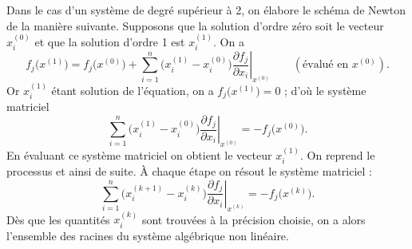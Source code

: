 Dans le cas d'un système de degré supérieur à 2, on élabore le schéma de
Newton de la manière suivante. Supposons que la solution d'ordre zéro soit le
vecteur $x_i^{(0)}$ et que la solution d'ordre 1 est $x_i^{(1)}$. On a
\[
  f_j\bigl(x^{(1)}\bigr) = f_j\bigl(x^{(0)}\bigr)
  + \sum_{i=1}^{n}\bigl(x_i^{(1)} - x_i^{(0)}\bigr)
    \left.\frac{\partial f_j}{\partial x_i}\right|_{x^{(0)}}
  \qquad (\text{évalué en } x^{(0)}) .
\]
Or $x_i^{(1)}$ étant solution de l'équation, on a $f_j\bigl(x^{(1)}\bigr) = 0$ ;
d'où le système matriciel
\[
  \sum_{i=1}^{n}\bigl(x_i^{(1)} - x_i^{(0)}\bigr)
  \left.\frac{\partial f_j}{\partial x_i}\right|_{x^{(0)}}
  = -f_j\bigl(x^{(0)}\bigr) .
\]
En évaluant ce système matriciel on obtient le vecteur $x_i^{(1)}$. On reprend
le processus et ainsi de suite. À chaque étape on résout le système
matriciel :
\[
  \sum_{i=1}^{n}\bigl(x_i^{(k+1)} - x_i^{(k)}\bigr)
  \left.\frac{\partial f_j}{\partial x_i}\right|_{x^{(k)}}
  = -f_j\bigl(x^{(k)}\bigr) .
\]
Dès que les quantités $x_i^{(k)}$ sont trouvées à la précision choisie, on a
alors l'ensemble des racines du système algébrique non linéaire.

